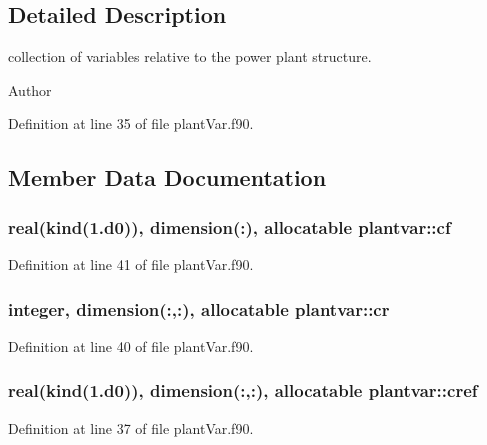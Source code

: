 \subsection{Detailed Description}
collection of variables relative to the power plant structure. \begin{DoxyAuthor}{Author}

\end{DoxyAuthor}


Definition at line 35 of file plant\-Var.\-f90.



\subsection{Member Data Documentation}
\hypertarget{classplantvar_a4c8201cedf0b99fc56c20ed525d1989f}{
\subsubsection[{cf}]{\setlength{\rightskip}{0pt plus 5cm}real(kind(1.d0)), dimension(\-:), allocatable plantvar\-::cf}}\label{classplantvar_a4c8201cedf0b99fc56c20ed525d1989f}


Definition at line 41 of file plant\-Var.\-f90.

\hypertarget{classplantvar_a01620e31bb05f1443908f0bff75215a4}{
\subsubsection[{cr}]{\setlength{\rightskip}{0pt plus 5cm}integer, dimension(\-:,\-:), allocatable plantvar\-::cr}}\label{classplantvar_a01620e31bb05f1443908f0bff75215a4}


Definition at line 40 of file plant\-Var.\-f90.

\hypertarget{classplantvar_acb2e8b2b10b5bac29d24d2eb880431cd}{
\subsubsection[{cref}]{\setlength{\rightskip}{0pt plus 5cm}real(kind(1.d0)), dimension(\-:,\-:), allocatable plantvar\-::cref}}\label{classplantvar_acb2e8b2b10b5bac29d24d2eb880431cd}


Definition at line 37 of file plant\-Var.\-f90.

